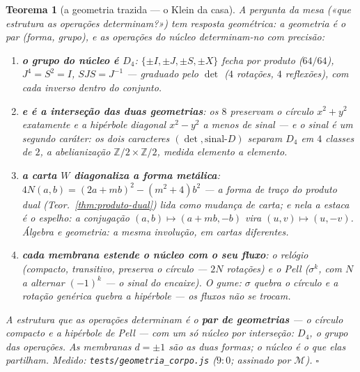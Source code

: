 \documentclass[11pt,a4paper]{article}
\newtheorem{teorema}{Teorema}
\newcommand{\code}[1]{\texttt{\small #1}}
\begin{document}
\begin{teorema}[a geometria trazida --- o Klein da casa]\label{thm:geometria}
A pergunta da mesa («que estrutura as operações determinam?») tem
resposta geométrica: \emph{a geometria é o par (forma, grupo)}, e as
operações do núcleo determinam-no com precisão:
\begin{enumerate}
\item \textbf{o grupo do núcleo é $D_{4}$}: $\{\pm I,\pm J,\pm S,
\pm X\}$ fecha por produto ($64/64$), $J^{4}=S^{2}=I$,
$SJS=J^{-1}$ --- graduado pelo $\det$ ($4$ rotações, $4$ reflexões),
com cada inverso dentro do conjunto.
\item \textbf{e é a interseção das duas geometrias}: os $8$
preservam o círculo $x^{2}{+}y^{2}$ \emph{exatamente} e a hipérbole
diagonal $x^{2}{-}y^{2}$ \emph{a menos de sinal} --- e o sinal é um
segundo caráter: os dois caracteres $(\det,\text{sinal-}D)$ separam
$D_{4}$ em $4$ classes de $2$, a abelianização
$\mathbb{Z}/2\times\mathbb{Z}/2$, medida elemento a elemento.
\item \textbf{a carta $W$ diagonaliza a forma metálica}:
$4N(a,b)=(2a{+}mb)^{2}-(m^{2}{+}4)b^{2}$ --- a forma de traço do
produto dual (Teor.~\ref{thm:produto-dual}) lida como mudança de
carta; e \emph{nela a estaca é o espelho}: a conjugação
$(a,b)\mapsto(a{+}mb,-b)$ vira $(u,v)\mapsto(u,-v)$. Álgebra e
geometria: a mesma involução, em cartas diferentes.
\item \textbf{cada membrana estende o núcleo com o seu fluxo}: o
relógio (compacto, transitivo, preserva o círculo --- $2N$ rotações)
e o Pell ($\sigma^{k}$, com $N$ a alternar $(-1)^{k}$ --- o sinal do
encaixe). O gume: $\sigma$ quebra o círculo e a rotação genérica
quebra a hipérbole --- \emph{os fluxos não se trocam}.
\end{enumerate}
A estrutura que as operações determinam é o \textbf{par de geometrias}
--- o círculo compacto e a hipérbole de Pell --- \emph{com um só
núcleo por interseção}: $D_{4}$, o grupo das operações. As membranas
$d=\pm1$ são as duas formas; o núcleo é o que elas partilham.
\emph{Medido:} \code{tests/geometria\_corpo.js} ($9{:}0$; assinado
por $\mathcal{M}$).
$\square$
\end{teorema}
\end{document}
